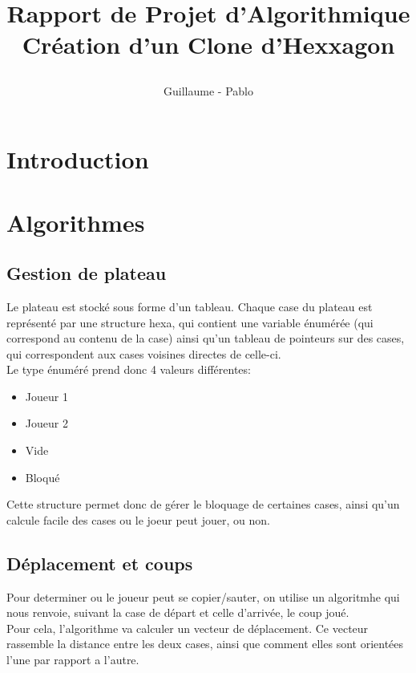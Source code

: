 \documentclass{report}
\begin{document}
\title{%
    \begin{minipage}\linewidth
        \centering
        Rapport de Projet d'Algorithmique
        \vskip 3pt
        \large Création d'un Clone d'Hexxagon
    \end{minipage}
}
\author{Guillaume  - Pablo }
\maketitle

\section{Introduction}
	
\section{Algorithmes}
	\subsection{Gestion de plateau}
		Le plateau est stocké sous forme d'un tableau.
		Chaque case du plateau est représenté par une structure hexa, qui contient une variable énumérée (qui correspond au contenu de la case) ainsi qu'un tableau de pointeurs sur des cases, qui correspondent aux cases voisines directes de celle-ci.\\
		Le type énuméré prend donc 4 valeurs différentes: 	\begin{itemize}
									\item Joueur 1
								  	\item Joueur 2
								  	\item Vide
								  	\item Bloqué
								  	\end{itemize}
	
		Cette structure permet donc de gérer le bloquage de certaines cases, ainsi qu'un calcule facile des cases ou le joeur peut jouer, ou non. 
	\subsection{Déplacement et coups}
	Pour determiner ou le joueur peut se copier/sauter, on utilise un algoritmhe qui nous renvoie, suivant la case de départ et celle d'arrivée, le coup joué.\\
	
	Pour cela, l'algorithme va calculer un vecteur de déplacement. Ce vecteur rassemble la distance entre les deux cases, ainsi que comment elles sont orientées l'une par rapport a l'autre.\\
	
\end{document}
